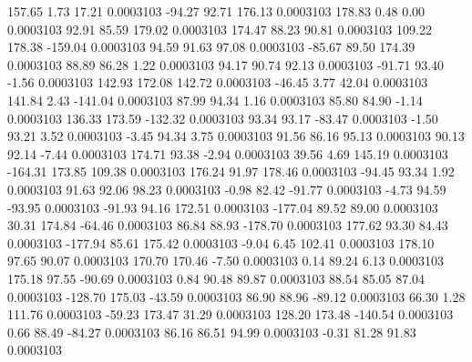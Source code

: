      157.65        1.73       17.21     0.0003103
      -94.27       92.71      176.13     0.0003103
      178.83        0.48        0.00     0.0003103
       92.91       85.59      179.02     0.0003103
      174.47       88.23       90.81     0.0003103
      109.22      178.38     -159.04     0.0003103
       94.59       91.63       97.08     0.0003103
      -85.67       89.50      174.39     0.0003103
       88.89       86.28        1.22     0.0003103
       94.17       90.74       92.13     0.0003103
      -91.71       93.40       -1.56     0.0003103
      142.93      172.08      142.72     0.0003103
      -46.45        3.77       42.04     0.0003103
      141.84        2.43     -141.04     0.0003103
       87.99       94.34        1.16     0.0003103
       85.80       84.90       -1.14     0.0003103
      136.33      173.59     -132.32     0.0003103
       93.34       93.17      -83.47     0.0003103
       -1.50       93.21        3.52     0.0003103
       -3.45       94.34        3.75     0.0003103
       91.56       86.16       95.13     0.0003103
       90.13       92.14       -7.44     0.0003103
      174.71       93.38       -2.94     0.0003103
       39.56        4.69      145.19     0.0003103
     -164.31      173.85      109.38     0.0003103
      176.24       91.97      178.46     0.0003103
      -94.45       93.34        1.92     0.0003103
       91.63       92.06       98.23     0.0003103
       -0.98       82.42      -91.77     0.0003103
       -4.73       94.59      -93.95     0.0003103
      -91.93       94.16      172.51     0.0003103
     -177.04       89.52       89.00     0.0003103
       30.31      174.84      -64.46     0.0003103
       86.84       88.93     -178.70     0.0003103
      177.62       93.30       84.43     0.0003103
     -177.94       85.61      175.42     0.0003103
       -9.04        6.45      102.41     0.0003103
      178.10       97.65       90.07     0.0003103
      170.70      170.46       -7.50     0.0003103
        0.14       89.24        6.13     0.0003103
      175.18       97.55      -90.69     0.0003103
        0.84       90.48       89.87     0.0003103
       88.54       85.05       87.04     0.0003103
     -128.70      175.03      -43.59     0.0003103
       86.90       88.96      -89.12     0.0003103
       66.30        1.28      111.76     0.0003103
      -59.23      173.47       31.29     0.0003103
      128.20      173.48     -140.54     0.0003103
        0.66       88.49      -84.27     0.0003103
       86.16       86.51       94.99     0.0003103
       -0.31       81.28       91.83     0.0003103
